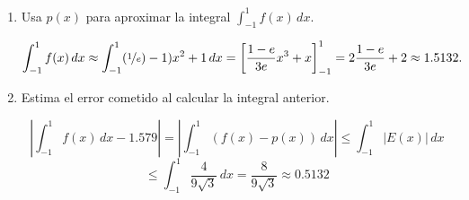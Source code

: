 \documentclass[12pt]{article}
\begin{document}
\begin{ejercicio}
\begin{enumerate}[label=\alph*)]
			\item Usa $p(x)$ para aproximar la integral $\displaystyle \int_{-1}^{1} f(x) \, dx.$
				
					$$ \int_{-1}^{1} f(x) \, dx \approx \int_{-1}^{1} (\nicefrac{1}{e}) -1)x^2 +1\, dx = \left[\frac{1-e}{3e}x^3+x\right]_{-1}^{1}=2\frac{1-e}{3e}+2\approx 1.5132.$$
					
			\item Estima el error cometido al calcular la integral anterior.
			
				$$ \left| \int_{-1}^{1} f(x) \, dx -1.579 \right| = \left| \int_{-1}^{1} \left(f(x)-p(x)\right) \, dx \right|
				\leq \int_{-1}^{1} |E(x)| \, dx$$
				$$ \leq \int_{-1}^{1} \frac{4}{9\sqrt{3}} \, dx = \frac{8}{9\sqrt{3}} \approx 0.5132 $$
				
		\end{enumerate}
	\end{ejercicio}
	
\end{document}
